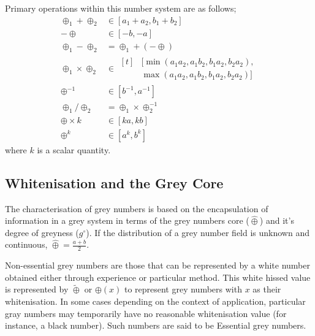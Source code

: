 Primary operations within this number system are as follows;
\begin{subequations}
  \begin{align}
    \oplus_1 + \oplus_2      &\in [a_1+a_2,b_1+b_2] \label{eq:grey_add}\\
    -\oplus         &\in [-b,-a] \label{eq:grey_neg} \\
    \oplus_1 - \oplus_2      &= \oplus_1+(-\oplus) \label{eq:grey_sub}\\
    \oplus_1 \times \oplus_2 &\in \begin{aligned}[t]
      &[\min(a_1 a_2, a_1 b_2, b_1 a_2, b_2 a_2), \\
      & \max(a_1 a_2, a_1 b_2, b_1 a_2, b_2 a_2)]
    \end{aligned} \label{grey_mult}\\
    \oplus^{-1} &\in [b^{-1}, a^{-1}] \label{eq:grey_inv}\\
    \oplus_1 / \oplus_2 & = \oplus_1 \times \oplus_2^{-1} \label{grey_mult} \\
    \oplus \times k &\in [ka,kb] \label{eq:grey_times_scalar}\\
    \oplus^k &\in [a^k, b^k] \label{eq:grey_exp}
  \end{align}
\end{subequations}
where $k$ is a scalar quantity.

\subsection{Whitenisation and the Grey Core}
The characterisation of grey numbers is based on the encapsulation of information in a grey system in terms of the grey numbers core ($\hat\oplus$) and it's degree of greyness ($g^\circ$).
If the distribution of a grey number field is unknown and continuous, $\hat\oplus = \frac{a + b}{2}$.

Non-essential grey numbers are those that can be represented by a white number obtained either through experience or particular method.
\cite{Liu2011}
This white hissed value is represented by $\tilde\oplus$ or $\oplus(x)$ to represent grey numbers with $x$ as their whitenisation.
In some cases depending on the context of application, particular gray numbers may temporarily have no reasonable whitenisation value (for instance, a black number).
Such numbers are said to be Essential grey numbers.

